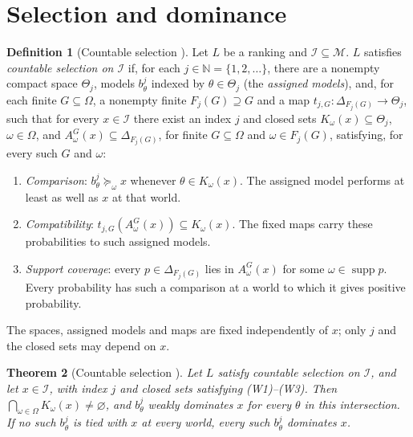 \documentclass[11pt]{article}
\newtheorem{theorem}{Theorem}[section]
\theoremstyle{definition}
\newtheorem{definition}[theorem]{Definition}
\newcommand{\M}{\mathcal M}
\newcommand{\I}{\mathcal I}
\DeclareMathOperator{\supp}{supp}
\begin{document}
\section{Selection and dominance}\label{sec:selection}

{\color{red}
\begin{definition}[Countable selection {\cite{LDG}}]\label{def:selection}
Let $L$ be a ranking and $\I\subseteq\M$. $L$ satisfies \emph{countable selection on $\I$} if, for each $j\in\mathbb N=\{1,2,\ldots\}$, there are a nonempty compact space $\Theta_j$, models $b^j_\theta$ indexed by $\theta\in\Theta_j$ (the \emph{assigned models}), and, for each finite $G\subseteq\Omega$, a nonempty finite $F_j(G)\supseteq G$ and a map $t_{j,G}:\Delta_{F_j(G)}\to\Theta_j$, such that for every $x\in\I$ there exist an index $j$ and closed sets $K_\omega(x)\subseteq\Theta_j$, $\omega\in\Omega$, and $A^G_\omega(x)\subseteq\Delta_{F_j(G)}$, for finite $G\subseteq\Omega$ and $\omega\in F_j(G)$, satisfying, for every such $G$ and $\omega$:
\begin{enumerate}[label=\textbf{(W\arabic*)},leftmargin=3.2em]
\item \emph{Comparison}: $b^j_\theta\succeq_\omega x$ whenever $\theta\in K_\omega(x)$. The assigned model performs at least as well as $x$ at that world.
\item \emph{Compatibility}: $t_{j,G}(A^G_\omega(x))\subseteq K_\omega(x)$. The fixed maps carry these probabilities to such assigned models.
\item \emph{Support coverage}: every $p\in\Delta_{F_j(G)}$ lies in $A^G_\omega(x)$ for some $\omega\in\supp p$. Every probability has such a comparison at a world to which it gives positive probability.
\end{enumerate}
The spaces, assigned models and maps are fixed independently of $x$; only $j$ and the closed sets may depend on $x$.
\end{definition}

\begin{theorem}[Countable selection {\cite{LDG}}]\label{thm:LDGgeneral} Let $L$ satisfy countable selection on $\I$, and let $x\in\I$, with index $j$ and closed sets satisfying (W1)--(W3). Then $\bigcap_{\omega\in\Omega}K_\omega(x)\ne\varnothing$, and $b^j_\theta$ weakly dominates $x$ for every $\theta$ in this intersection. If no such $b^j_\theta$ is tied with $x$ at every world, every such $b^j_\theta$ dominates $x$.
\end{theorem}
}
\end{document}
